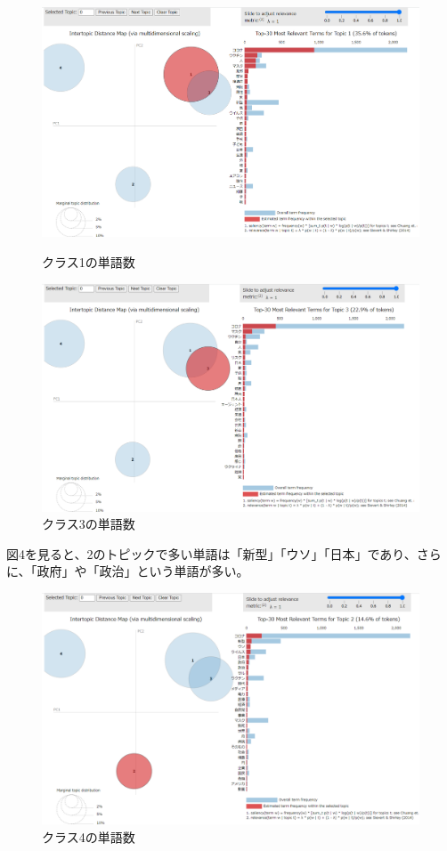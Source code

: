\documentclass[a4paper, 11pt, titlepage]{jsarticle}
\begin{document}
\begin{figure}[H]
  \centering
  \includegraphics[scale=0.25]{picture2.png}
  \caption{クラス1の単語数}
  \centering
  \includegraphics[scale=0.25]{picture3.png}
  \caption{クラス3の単語数}
\end{figure}
\newpage
図4を見ると、2のトピックで多い単語は「新型」「ウソ」「日本」であり、さらに、「政府」や「政治」という単語が多い。\\
\begin{figure}[H]
  \centering
  \includegraphics[scale=0.25]{picture4.png}
  \caption{クラス4の単語数}
\end{figure}
\end{document}

